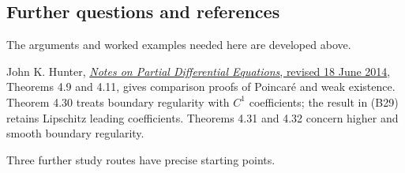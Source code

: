 \documentclass[
  11pt,
]{article}
\makeatletter
\let\ReaderOriginalAnchorStart\hyper@anchorstart
\let\ReaderOriginalAnchorEnd\hyper@anchorend
\let\ReaderPendingAliases\@empty
\def\ReaderArmAliases#1{\gdef\ReaderPendingAliases{#1}}
\def\hyper@anchorstart#1{\ReaderIfNativeAnchorTF{#1}{\ReaderPendingAliases\global\let\ReaderPendingAliases\@empty}{}\ReaderOriginalAnchorStart{#1}}
\makeatother
\begin{document}
\ReaderArmAliases{\ReaderOriginalAnchorStart{reading-routes-and-remaining-interfaces}\ReaderOriginalAnchorEnd\begingroup\expandafter\def\csname @currentHref\endcsname{reading-routes-and-remaining-interfaces}\label{reading-routes-and-remaining-interfaces}\endgroup\ReaderOriginalAnchorStart{further-questions-and-references}\ReaderOriginalAnchorEnd}
\subsection{Further questions and
references}\label{further-questions-and-references}

The arguments and worked examples needed here are developed above.

John K. Hunter,
\href{https://www.math.ucdavis.edu/~hunter/pdes/pde_notes.pdf}{\emph{Notes
on Partial Differential Equations}, revised 18 June 2014}, Theorems 4.9
and 4.11, gives comparison proofs of Poincaré and weak existence.
Theorem 4.30 treats boundary regularity with \(C^1\) coefficients; the
result in (B29) retains Lipschitz leading coefficients. Theorems 4.31
and 4.32 concern higher and smooth boundary regularity.

Three further study routes have precise starting points.
\end{document}

